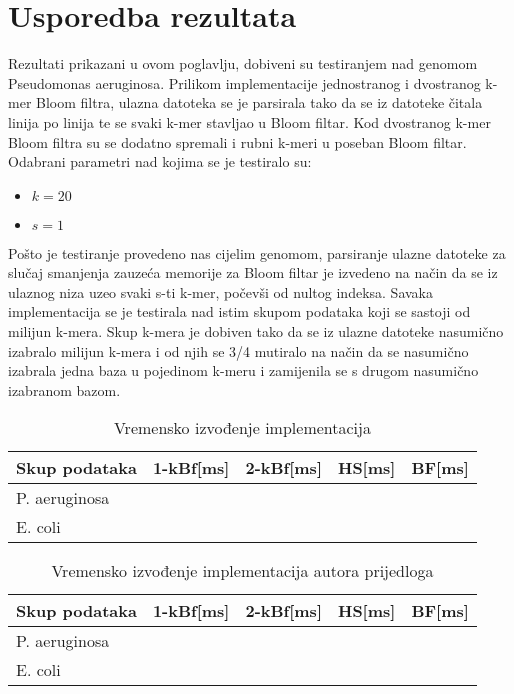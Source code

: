 \documentclass[times, utf8, seminar, numeric]{fer}
\begin{document}
\chapter{Usporedba rezultata}
Rezultati prikazani u ovom poglavlju, dobiveni su testiranjem nad genomom
Pseudomonas aeruginosa. Prilikom implementacije jednostranog i dvostranog k-mer
Bloom filtra, ulazna datoteka se je parsirala tako da se iz datoteke čitala linija
po linija te se svaki k-mer stavljao u Bloom filtar. Kod dvostranog k-mer Bloom
filtra su se dodatno spremali i rubni k-meri u poseban Bloom filtar. Odabrani
parametri nad kojima se je testiralo su:
\begin{itemize}
  \item{$k = 20$}
  \item{$s = 1$}
\end{itemize}
Pošto je testiranje provedeno nas cijelim genomom, parsiranje ulazne datoteke za
slučaj smanjenja zauzeća memorije za Bloom filtar je izvedeno na način da se iz
ulaznog niza uzeo svaki s-ti k-mer, počevši od nultog indeksa.
Savaka implementacija se je testirala nad istim skupom podataka koji se sastoji
od milijun k-mera. Skup k-mera je dobiven tako da se iz ulazne datoteke nasumično
izabralo milijun k-mera i od njih se 3/4 mutiralo na način da se nasumično izabrala
jedna baza u pojedinom k-meru i zamijenila se s drugom nasumično izabranom bazom.

\begin{table}[H]
  \centering
  \caption{Vremensko izvođenje implementacija}
  \begin{tabular}{|| p{2.7cm} | p{2cm} | p{2cm} | p{2cm} | p{2cm} ||}
    \hline
    Skup podataka & 1-kBf[ms] & 2-kBf[ms] & HS[ms] & BF[ms]\\
    \hline\hline
    P. aeruginosa & & & &\\
    \hline
    E. coli & & & &\\
    \hline
  \end{tabular}
\end{table}

\begin{table}[H]
  \centering
  \caption{Vremensko izvođenje implementacija autora prijedloga}
  \begin{tabular}{|| p{2.7cm} | p{2cm} | p{2cm} | p{2cm} | p{2cm} ||}
    \hline
    Skup podataka & 1-kBf[ms] & 2-kBf[ms] & HS[ms] & BF[ms]\\
    \hline\hline
    P. aeruginosa & & & &\\
    \hline
    E. coli & & & &\\
    \hline
  \end{tabular}
\end{table}
\end{document}

